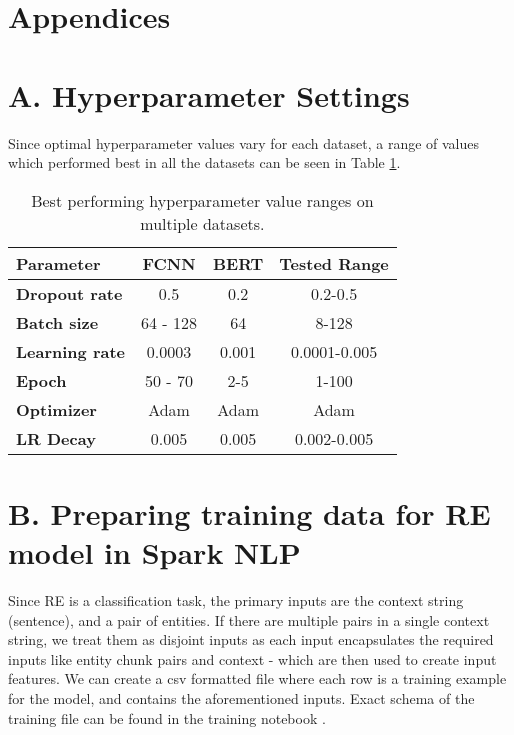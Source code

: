 \documentclass[letterpaper]{article}
\begin{document}
\section{Appendices}

\appendix
\section{A. Hyperparameter Settings}

Since optimal hyperparameter values vary for each dataset, a range of values which performed best in all the datasets can be seen in Table \ref{tab:re_params}.
\begin{table}[ht]
\centering
\begin{tabular}{ lccc}
\toprule
\textbf{Parameter} & \textbf{FCNN} & \textbf{BERT} & \textbf{Tested Range} \\
\midrule
\textbf{Dropout rate} & 0.5 & 0.2 & 0.2-0.5\\
\textbf{Batch size} & 64 - 128 & 64 & 8-128\\
\textbf{Learning rate} & 0.0003 & 0.001 & 0.0001-0.005\\
\textbf{Epoch} & 50 - 70 & 2-5 & 1-100\\
\textbf{Optimizer} & Adam & Adam & Adam\\
\textbf{LR Decay} & 0.005 & 0.005 & 0.002-0.005\\
\bottomrule
\end{tabular}
\caption{Best performing hyperparameter value ranges on multiple datasets.}
\label{tab:re_params}
\end{table}

\section{B. Preparing training data for RE model in Spark NLP}
Since RE is a classification task, the primary inputs are the context string (sentence), and a pair of entities. If there are multiple pairs in a single context string, we treat them as disjoint inputs as each input encapsulates the required inputs like entity chunk pairs and context - which are then used to create input features. We can create a csv formatted file where each row is a training example for the model, and contains the aforementioned inputs. Exact schema of the training file can be found in the training notebook \cite{re_training_code}.
\end{document}
